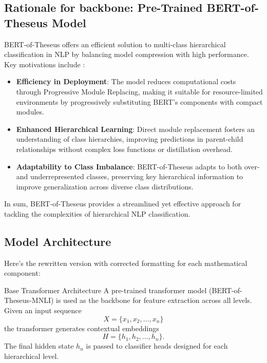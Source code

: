 \documentclass[9pt,a4paper,twoside]{rho-class/rho}
\begin{document}
    \subsection{\textbf{Rationale for backbone: Pre-Trained BERT-of-Theseus Model}}

        BERT-of-Theseus offers an efficient solution to multi-class hierarchical classification in NLP by balancing model compression with high performance. Key motivations include \cite{xu2020bert}:

\begin{itemize}
    \item \textbf{Efficiency in Deployment}: The model reduces computational costs through Progressive Module Replacing, making it suitable for resource-limited environments by progressively substituting BERT’s components with compact modules.

    \item \textbf{Enhanced Hierarchical Learning}: Direct module replacement fosters an understanding of class hierarchies, improving predictions in parent-child relationships without complex loss functions or distillation overhead.
    
    \item \textbf{Adaptability to Class Imbalance}: BERT-of-Theseus adapts to both over- and underrepresented classes, preserving key hierarchical information to improve generalization across diverse class distributions.
\end{itemize}

In sum, BERT-of-Theseus provides a streamlined yet effective approach for tackling the complexities of hierarchical NLP classification.

  \subsection{Model Architecture}
    
        Here’s the rewritten version with corrected formatting for each mathematical component:

        Base Transformer Architecture  
        A pre-trained transformer model (BERT-of-Theseus-MNLI) is used as the backbone for feature extraction across all levels. Given an input sequence 
        \[
        X = \{x_1, x_2, \ldots, x_n\}
        \]
        the transformer generates contextual embeddings 
        \[
        H = \{h_1, h_2, \ldots, h_n\}.
        \]
        The final hidden state \( h_n \) is passed to classifier heads designed for each hierarchical level.
        
\end{document}
